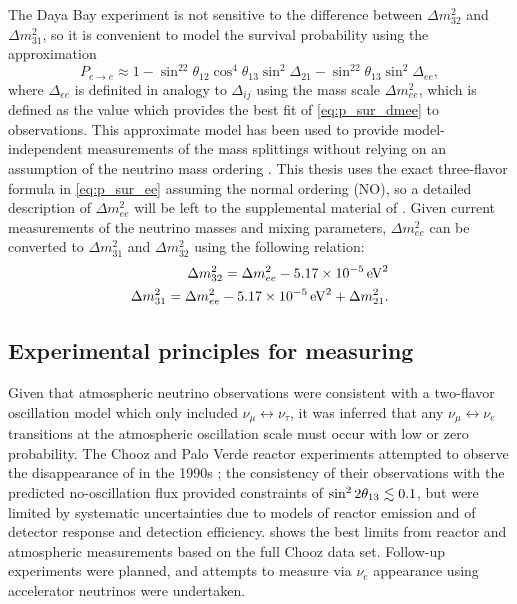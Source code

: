 The Daya Bay experiment is not sensitive
to the difference between $\Delta m^2_{32}$ and $\Delta m^2_{31}$,
so it is convenient to model the survival probability
using the approximation
\begin{equation}\label{eq:p_sur_dmee}
    P_{e\to e} \approx 1
    - \sin^22\theta_{12}\cos^4\theta_{13}\sin^2\Delta_{21}
    - \sin^22\theta_{13}\sin^2\Delta_{ee},
\end{equation}
where $\Delta_{ee}$ is definited in analogy to $\Delta_{ij}$
using the mass scale $\Delta m^2_{ee}$,
which is defined as the value which provides the best fit
of \cref{eq:p_sur_dmee} to observations.
This approximate model has been used to provide
model-independent measurements of the mass splittings
without relying on an assumption of the neutrino mass ordering
\cite{ngd2014,ngd2015,ngd2016,ngd2018}.
This thesis uses the exact three-flavor formula in \cref{eq:p_sur_ee}
assuming the normal ordering (NO),
so a detailed description of $\Delta m^2_{ee}$
will be left to the supplemental material of \cite{ngd2015}.
Given current measurements of the neutrino masses and mixing parameters,
$\Delta m^2_{ee}$ can be converted to $\Delta m^2_{31}$ and $\Delta m^2_{32}$
using the following relation:
\begin{align}\label{eq:dmee_conversion}
    \begin{split}
        \Delta m^2_{32} = \dmee - \SI{5.17e-5}{\eV\squared} \\
        \Delta m^2_{31} = \dmee - \SI{5.17e-5}{\eV\squared} + \Delta m^2_{21}.
    \end{split}
\end{align}

\subsection{Experimental principles for measuring \texorpdfstring{\thetaot}{theta13}}
\label{subsec:theta13_experiments}

Given that atmospheric neutrino observations were consistent
with a two-flavor oscillation model which only included $\nu_\mu\leftrightarrow\nu_\tau$,
it was inferred that any $\nu_\mu\leftrightarrow\nu_e$ transitions
at the atmospheric oscillation scale
must occur with low or zero probability.
The Chooz and Palo Verde reactor \nuebar{} experiments
attempted to observe the disappearance of \nuebar{} in the 1990s
\cite{chooz1999,paloverde2001};
the consistency of their observations with the predicted no-oscillation flux
provided constraints of $\sin^22\theta_{13} \lesssim 0.1$,
but were limited by systematic uncertainties
due to models of reactor \nuebar{} emission
and of detector response and detection efficiency.
 shows the best limits
from reactor and atmospheric measurements
based on the full Chooz data set.
Follow-up experiments were planned,
and attempts to measure \thetaot{} via $\nu_e$ appearance
using accelerator neutrinos were undertaken.

